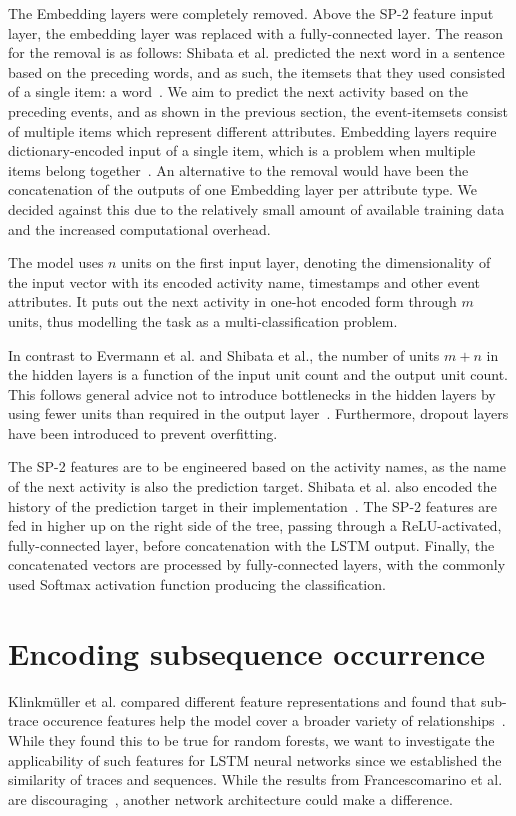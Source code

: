 The Embedding layers were completely removed. Above the SP-2 feature input layer, the embedding layer was replaced with a fully-connected layer. The reason for the removal is as follows: Shibata et al. predicted the next word in a sentence based on the preceding words, and as such, the itemsets that they used consisted of a single item: a word~\cite{shibata2016bipartite}. We aim to predict the next activity based on the preceding events, and as shown in the previous section, the event-itemsets consist of multiple items which represent different attributes.
Embedding layers require dictionary-encoded input of a single item, which is a problem when multiple items belong together~\cite{goldberg2014word2vec}. An alternative to the removal would have been the concatenation of the outputs of one Embedding layer per attribute type. We decided against this due to the relatively small amount of available training data and the increased computational overhead.

The model uses $n$ units on the first input layer, denoting the dimensionality of the input vector with its encoded activity name, timestamps and other event attributes. It puts out the next activity in one-hot encoded form through $m$ units, thus modelling the task as a multi-classification problem.

In contrast to Evermann et al. and Shibata et al., the number of units $m+n$ in the hidden layers is a function of the input unit count and the output unit count. This follows general advice not to introduce bottlenecks in the hidden layers by using fewer units than required in the output layer~\cite{web:techniques-in-convnets,szegedy2016rethinking}. Furthermore, dropout layers have been introduced to prevent overfitting.

The SP-2 features are to be engineered based on the activity names, as the name of the next activity is also the prediction target. Shibata et al. also encoded the history of the prediction target in their implementation~\cite{shibata2016bipartite}. The SP-2 features are fed in higher up on the right side of the tree, passing through a ReLU-activated, fully-connected layer, before concatenation with the LSTM output. Finally, the concatenated vectors are processed by fully-connected layers, with the commonly used Softmax activation function producing the classification.

\section{Encoding subsequence occurrence}
\label{sec:contrib:pfs-inspiration}
Klinkmüller et al. compared different feature representations and found that sub-trace occurence features help the model cover a broader variety of relationships~\cite{klinkmuller2018reliablemonitoring}. While they found this to be true for random forests, we want to investigate the applicability of such features for LSTM neural networks since we established the similarity of traces and sequences. While the results from Francescomarino et al. are discouraging~\cite{francescomarino2017}, another network architecture could make a difference.

